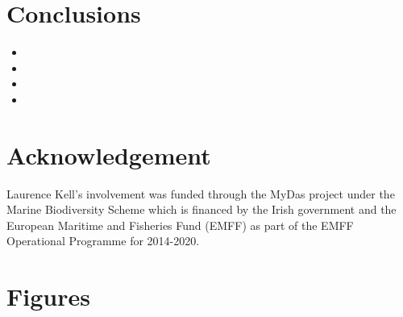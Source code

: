 \documentclass[12pt,doublespacing,a4paper]{ouparticle}
\begin{document}


\section{Conclusions}

\begin{itemize}
 \item 
 \item 
 \item 
 \item 
\end{itemize}

\section{Acknowledgement}

Laurence Kell's involvement was funded through the MyDas project under the Marine Biodiversity Scheme which is financed by the Irish government and the European Maritime and Fisheries Fund (EMFF) as part of the EMFF Operational Programme for 2014-2020. 

\clearpage
%
%


\clearpage
\section{Figures}
\end{document}
